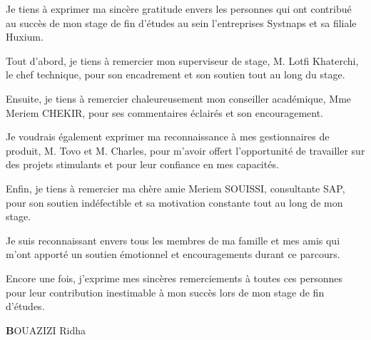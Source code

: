 Je tiens à exprimer ma sincère gratitude envers les personnes qui ont contribué au succès de mon stage de fin d'études au sein l’entreprises Systnaps et sa filiale Huxium. 

Tout d'abord, je tiens à remercier mon superviseur de stage, M. Lotfi Khaterchi, le chef technique, pour son encadrement et son soutien tout au long du stage.  

Ensuite, je tiens à remercier chaleureusement mon conseiller académique, Mme Meriem CHEKIR, pour ses commentaires éclairés et son encouragement. 

Je voudrais également exprimer ma reconnaissance à mes gestionnaires de produit, M. Tovo et M. Charles, pour m'avoir offert l'opportunité de travailler sur des projets stimulants et pour leur confiance en mes capacités. 

Enfin, je tiens à remercier ma chère amie Meriem SOUISSI, consultante SAP, pour son soutien indéfectible et sa motivation constante tout au long de mon stage. 

Je suis reconnaissant envers tous les membres de ma famille et mes amis qui m'ont apporté un soutien émotionnel et encouragements durant ce parcours. 

Encore une fois, j'exprime mes sincères remerciements à toutes ces personnes pour leur contribution inestimable à mon succès lors de mon stage de fin d'études.

\begin{flushright}
\textbf BOUAZIZI Ridha
\end{flushright}